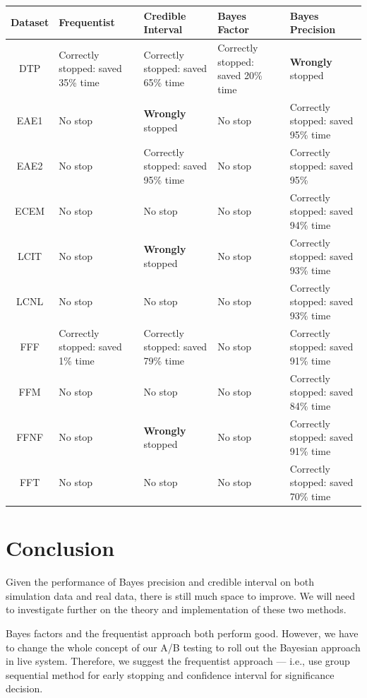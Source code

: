 \documentclass[paper=a4, fontsize=11pt]{scrartcl} %
\numberwithin{equation}{section} %
\numberwithin{figure}{section} %
\numberwithin{table}{section} %
\begin{document}
\begin{center}
  \begin{tabular}{ | c | p{30mm} | p{30mm} | p{30mm} | p{30mm} |}
    \hline
     Dataset & Frequentist  & Credible Interval & Bayes Factor & Bayes Precision \\ \hline\hline
     DTP & Correctly stopped: saved 35\% time & Correctly stopped: saved 65\% time & Correctly stopped: saved 20\% time & \textbf{Wrongly} stopped \\ \hline
     EAE1 & No stop & \textbf{Wrongly} stopped & No stop & Correctly stopped: saved 95\% time \\ \hline
     EAE2 & No stop & Correctly stopped: saved 95\% time & No stop & Correctly stopped: saved 95\% \\ \hline
     ECEM & No stop & No stop & No stop & Correctly stopped: saved 94\% time \\ \hline
     LCIT & No stop & \textbf{Wrongly} stopped & No stop & Correctly stopped: saved 93\% time\\ \hline
     LCNL & No stop & No stop & No stop & Correctly stopped: saved 93\% time \\ \hline
     FFF & Correctly stopped: saved 1\% time & Correctly stopped: saved 79\% time & No stop & Correctly stopped: saved 91\% time \\ \hline
     FFM & No stop & No stop & No stop & Correctly stopped: saved 84\% time \\ \hline
     FFNF & No stop & \textbf{Wrongly} stopped & No stop & Correctly stopped: saved 91\% time\\ \hline
     FFT & No stop & No stop & No stop & Correctly stopped: saved 70\% time \\ \hline
  \end{tabular}
\label{table:final}
\end{center}


\section{Conclusion}
Given the performance of Bayes precision and credible interval on both simulation data and real data, there is still much space to improve. We will need to investigate further on the theory and implementation of these two methods.

Bayes factors and the frequentist approach both perform good. However, we have to change the whole concept of our A/B testing to roll out the Bayesian approach in live system. Therefore, we suggest the frequentist approach --- i.e., use group sequential method for early stopping and confidence interval for significance decision.

\end{document}
